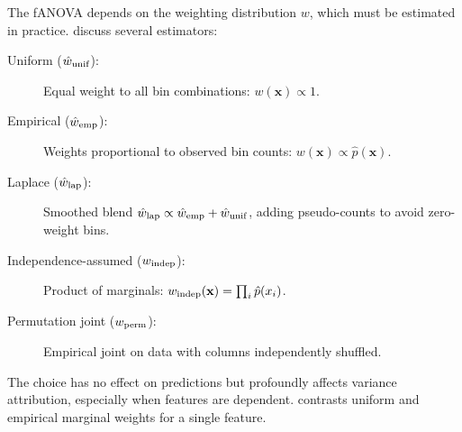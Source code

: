The \gls{fANOVA} depends on the weighting distribution $w$, which must be estimated in practice.
\citet{lengerich2020purifying} discuss several estimators:

\begin{description}
    \item[Uniform ($\hat{w}_{\mathrm{unif}}$):] Equal weight to all bin combinations: $w(\mathbf{x}) \propto 1$.
    \item[Empirical ($\hat{w}_{\mathrm{emp}}$):] Weights proportional to observed bin counts: $w(\mathbf{x}) \propto \hat{p}(\mathbf{x})$.
    \item[Laplace ($\hat{w}_{\mathrm{lap}}$):] Smoothed blend $\hat{w}_{\mathrm{lap}} \propto \hat{w}_{\mathrm{emp}} + \hat{w}_{\mathrm{unif}}$, adding pseudo-counts to avoid zero-weight bins.
    \item[Independence-assumed ($w_{\mathrm{indep}}$):] Product of marginals: $w_{\mathrm{indep}}(\mathbf{x}) = \prod_i \hat{p}(x_i)$.
    \item[Permutation joint ($w_{\mathrm{perm}}$):] Empirical joint on data with columns independently shuffled.
\end{description}

The choice has no effect on predictions but profoundly affects variance attribution, especially when features are dependent.
 contrasts uniform and empirical marginal weights for a single feature.

